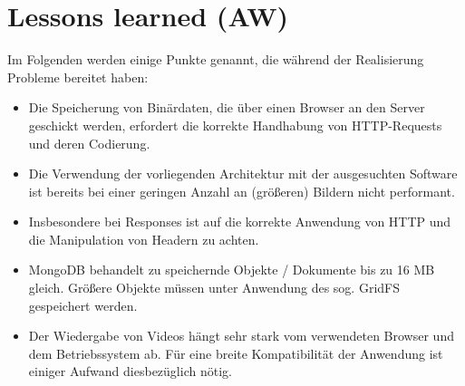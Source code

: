 \clearpage
\section{Lessons learned (AW)}
Im Folgenden werden einige Punkte genannt, die während der Realisierung Probleme bereitet haben:
\begin{itemize}
	\item Die Speicherung von Binärdaten, die über einen Browser an den Server geschickt werden,
	erfordert die korrekte Handhabung von HTTP-Requests und deren Codierung.
	\item Die Verwendung der vorliegenden Architektur mit der ausgesuchten Software 
	ist bereits bei einer geringen Anzahl an (größeren) Bildern nicht performant.
	\item Insbesondere bei Responses ist auf die korrekte Anwendung von HTTP und die Manipulation von Headern zu achten.
	\item MongoDB behandelt zu speichernde Objekte / Dokumente bis zu 16 MB gleich. Größere Objekte
	müssen unter Anwendung des sog. GridFS gespeichert werden.
	\item Der Wiedergabe von Videos hängt sehr stark vom verwendeten Browser und dem Betriebssystem
	ab. Für eine breite Kompatibilität der Anwendung ist einiger Aufwand diesbezüglich nötig.
\end{itemize}